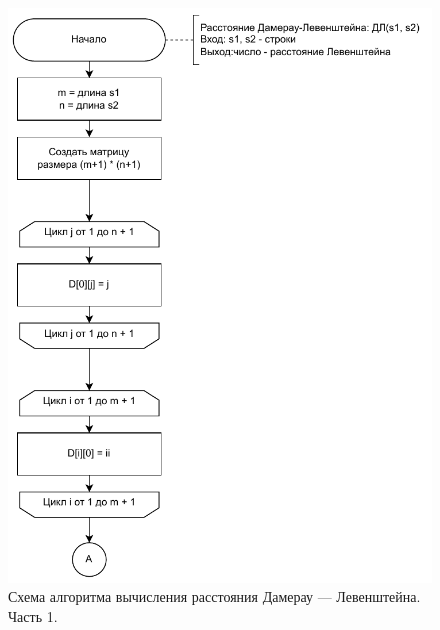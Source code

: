 \begin{figure}[H]
    \centering
    \includegraphics[width=170mm]{images/dl_part1}
    \caption{Схема алгоритма вычисления расстояния Дамерау — Левенштейна. Часть 1.}
    \label{images:dl_part1}
\end{figure}

